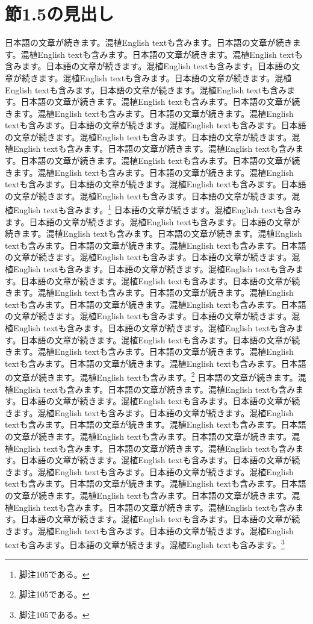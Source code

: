 \documentclass[pdflatex,book]{jlreq}
\begin{document}
\section{節1.5の見出し}
日本語の文章が続きます。混植English textも含みます。日本語の文章が続きます。混植English textも含みます。日本語の文章が続きます。混植English textも含みます。日本語の文章が続きます。混植English textも含みます。日本語の文章が続きます。混植English textも含みます。日本語の文章が続きます。混植English textも含みます。日本語の文章が続きます。混植English textも含みます。日本語の文章が続きます。混植English textも含みます。日本語の文章が続きます。混植English textも含みます。日本語の文章が続きます。混植English textも含みます。日本語の文章が続きます。混植English textも含みます。日本語の文章が続きます。混植English textも含みます。日本語の文章が続きます。混植English textも含みます。日本語の文章が続きます。混植English textも含みます。日本語の文章が続きます。混植English textも含みます。日本語の文章が続きます。混植English textも含みます。日本語の文章が続きます。混植English textも含みます。日本語の文章が続きます。混植English textも含みます。日本語の文章が続きます。混植English textも含みます。日本語の文章が続きます。混植English textも含みます。\footnote{脚注105である。}
日本語の文章が続きます。混植English textも含みます。日本語の文章が続きます。混植English textも含みます。日本語の文章が続きます。混植English textも含みます。日本語の文章が続きます。混植English textも含みます。日本語の文章が続きます。混植English textも含みます。日本語の文章が続きます。混植English textも含みます。日本語の文章が続きます。混植English textも含みます。日本語の文章が続きます。混植English textも含みます。日本語の文章が続きます。混植English textも含みます。日本語の文章が続きます。混植English textも含みます。日本語の文章が続きます。混植English textも含みます。日本語の文章が続きます。混植English textも含みます。日本語の文章が続きます。混植English textも含みます。日本語の文章が続きます。混植English textも含みます。日本語の文章が続きます。混植English textも含みます。日本語の文章が続きます。混植English textも含みます。日本語の文章が続きます。混植English textも含みます。日本語の文章が続きます。混植English textも含みます。日本語の文章が続きます。混植English textも含みます。日本語の文章が続きます。混植English textも含みます。\footnote{脚注105である。}
日本語の文章が続きます。混植English textも含みます。日本語の文章が続きます。混植English textも含みます。日本語の文章が続きます。混植English textも含みます。日本語の文章が続きます。混植English textも含みます。日本語の文章が続きます。混植English textも含みます。日本語の文章が続きます。混植English textも含みます。日本語の文章が続きます。混植English textも含みます。日本語の文章が続きます。混植English textも含みます。日本語の文章が続きます。混植English textも含みます。日本語の文章が続きます。混植English textも含みます。日本語の文章が続きます。混植English textも含みます。日本語の文章が続きます。混植English textも含みます。日本語の文章が続きます。混植English textも含みます。日本語の文章が続きます。混植English textも含みます。日本語の文章が続きます。混植English textも含みます。日本語の文章が続きます。混植English textも含みます。日本語の文章が続きます。混植English textも含みます。日本語の文章が続きます。混植English textも含みます。日本語の文章が続きます。混植English textも含みます。日本語の文章が続きます。混植English textも含みます。\footnote{脚注105である。}
\end{document}
